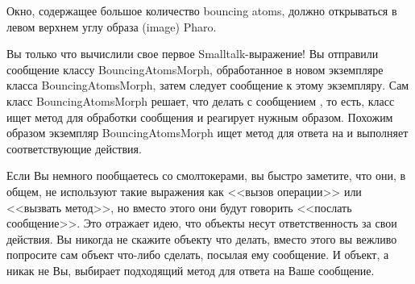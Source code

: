 \documentclass[a4paper,10pt,twoside]{book}
\begin{document}
Окно, содержащее большое количество bouncing atoms,
должно открываться в левом верхнем углу образа (image) Pharo. 


Вы только что вычислили свое первое Smalltalk-выражение!
Вы отправили сообщение  классу BouncingAtomsMorph,
обработанное в новом экземпляре класса BouncingAtomsMorph,
затем следует сообщение  к этому экземпляру. Сам класс
BouncingAtomsMorph решает, что делать с сообщением , то есть,
класс ищет метод для обработки сообщения  и реагирует
нужным образом. Похожим образом экземпляр BouncingAtomsMorph ищет
метод для ответа на  и выполняет
соответствующие действия. 


Если Вы немного пообщаетесь со смолтокерами, вы быстро заметите,
что они, в общем,  не используют такие выражения как
<<вызов операции>> или <<вызвать метод>>, но вместо этого
они будут говорить <<послать сообщение>>. Это отражает идею, что
объекты несут ответственность за свои действия.
Вы никогда не скажите объекту что делать, вместо этого вы вежливо
попросите сам объект что-либо сделать, посылая ему сообщение.
И объект, а никак не Вы, выбирает подходящий метод для ответа
на Ваше сообщение.

\end{document}
